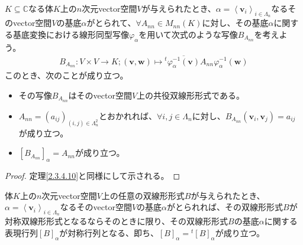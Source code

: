\documentclass[dvipdfmx]{jsarticle}
\begin{document}
\begin{thm}\label{2.3.4.11}
$K \subseteq \mathbb{C}$なる体$K$上の$n$次元vector空間$V$が与えられたとき、$\alpha = \left\langle \mathbf{v}_{i} \right\rangle_{i \in \varLambda_{n}}$なるそのvector空間$V$の基底$\alpha$がとられて、$\forall A_{nn} \in M_{nn}(K)$に対し、その基底$\alpha$に関する基底変換における線形同型写像$\varphi_{\alpha}$を用いて次式のような写像$B_{A_{nn}}$を考えよう。
\begin{align*}
B_{A_{nn}}:V \times V \rightarrow K;\left( \mathbf{v},\mathbf{w} \right) \mapsto{}^{t}\overline{\varphi_{\alpha}^{- 1}\left( \mathbf{v} \right)}A_{nn}\varphi_{\alpha}^{- 1}\left( \mathbf{w} \right)
\end{align*}
このとき、次のことが成り立つ。
\begin{itemize}
\item
  その写像$B_{A_{nn}}$はそのvector空間$V$上の共役双線形形式である。
\item
  $A_{nn} = \left( a_{ij} \right)_{(i,j) \in \varLambda_{n}^{2}}$とおかれれば、$\forall i,j \in \varLambda_{n}$に対し、$B_{A_{nn}}\left( \mathbf{v}_{i},\mathbf{v}_{j} \right) = a_{ij}$が成り立つ。
\item
  $\left[ B_{A_{nn}} \right]_{\alpha} = A_{nn}$が成り立つ。
\end{itemize}
\end{thm}
\begin{proof} 定理\ref{2.3.4.10}と同様にして示される。
\end{proof}
\begin{thm}\label{2.3.4.12}
体$K$上の$n$次元vector空間$V$上の任意の双線形形式$B$が与えられたとき、$\alpha = \left\langle \mathbf{v}_{i} \right\rangle_{i \in \varLambda_{n}}$なるそのvector空間$V$の基底$\alpha$がとられれば、その双線形形式$B$が対称双線形形式となるならそのときに限り、その双線形形式$B$の基底$\alpha$に関する表現行列$[ B]_{\alpha}$が対称行列となる、即ち、$[ B]_{\alpha} ={}^{t}[ B]_{\alpha}$が成り立つ。
\end{thm}
\end{document}
